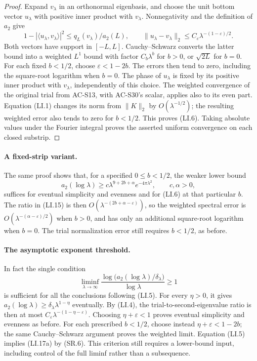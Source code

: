 \begin{proof}
Expand \(v_\lambda\) in an orthonormal eigenbasis, and choose the
unit bottom vector \(u_\lambda\) with positive inner product with
\(v_\lambda\).  Nonnegativity and the definition of \(a_2\) give
\[
 1-|\langle u_\lambda,v_\lambda\rangle|^2
                  \le q_L(v_\lambda)/a_2(L),
 \qquad
 \|u_\lambda-v_\lambda\|_2
                  \le C_\varepsilon\lambda^{-(1-\varepsilon)/2}.
 \tag{LI.16}
\]
Both vectors have support in \([-L,L]\).
Cauchy--Schwarz converts the latter bound into a weighted \(L^1\)
bound with factor \(C_b\lambda^b\) for \(b>0\), or
\(\sqrt{2L}\) for \(b=0\).  For each fixed \(b<1/2\), choose \(\varepsilon<1-2b\).
The errors then tend to zero, including the square-root logarithm
when \(b=0\).  The phase of \(u_\lambda\) is fixed by its positive
inner product with \(v_\lambda\), independently of this choice.
The weighted convergence of the original trial
from AC-S13, with AC-S30's scalar, applies also to its even part.
Equation (LI.1) changes its norm from \(\|K\|_2\) by
\(O(\lambda^{-1/2})\); the resulting weighted error also tends
to zero for \(b<1/2\).  This proves (LI.6).  Taking absolute
values under the Fourier integral proves the asserted uniform
convergence on each closed substrip.
\end{proof}

\paragraph{A fixed-strip variant.}
The same proof shows that, for a specified \(0\le b<1/2\),
the weaker lower bound
\[
 a_2(\log\lambda)\ge
           c\lambda^{9+2b+\alpha}e^{-4\pi\lambda^2},
                  \qquad c,\alpha>0,
 \tag{LI.17}
\]
suffices for eventual simplicity and evenness and for (LI.6) at
that particular \(b\).  The ratio in (LI.15) is then
\(O(\lambda^{-(2b+\alpha-\varepsilon)})\), so the weighted
spectral error is \(O(\lambda^{-(\alpha-\varepsilon)/2})\)
when \(b>0\), and has only an additional square-root logarithm
when \(b=0\).  The trial normalization error still requires
\(b<1/2\), as before.

\paragraph{The asymptotic exponent threshold.}
In fact the single condition
\[
 \liminf_{\lambda\to\infty}
       \frac{\log\bigl(a_2(\log\lambda)/\delta_\lambda\bigr)}
            {\log\lambda}\ge1
 \tag{LI.17a}
\]
is sufficient for all the conclusions following (LI.5).
For every \(\eta>0\), it gives
\(a_2(\log\lambda)\ge\delta_\lambda\lambda^{1-\eta}\)
eventually.  By (LI.4), the trial-to-second-eigenvalue ratio is then
at most \(C_\varepsilon\lambda^{-(1-\eta-\varepsilon)}\).
Choosing \(\eta+\varepsilon<1\) proves eventual simplicity and
evenness as before.  For each prescribed \(b<1/2\), choose instead
\(\eta+\varepsilon<1-2b\); the same Cauchy--Schwarz argument proves
the weighted limit.  Equation (LI.5) implies (LI.17a) by (SR.6).
This criterion still requires a lower-bound input, including control
of the full liminf rather than a subsequence.

